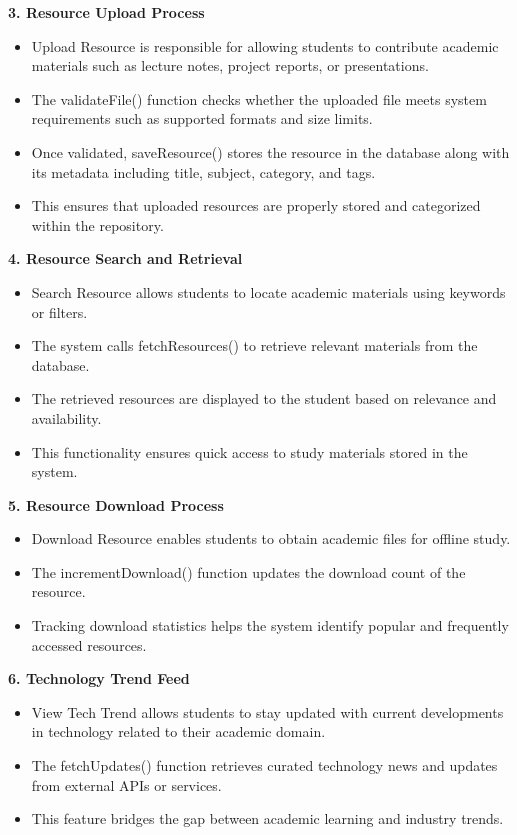 \documentclass[12pt,a4paper]{report}
\begin{document}
\textbf{3. Resource Upload Process}

\begin{itemize}
\item Upload Resource is responsible for allowing students to contribute academic materials such as lecture notes, project reports, or presentations.
\item The validateFile() function checks whether the uploaded file meets system requirements such as supported formats and size limits.
\item Once validated, saveResource() stores the resource in the database along with its metadata including title, subject, category, and tags.
\item This ensures that uploaded resources are properly stored and categorized within the repository.
\end{itemize}

\textbf{4. Resource Search and Retrieval}

\begin{itemize}
\item Search Resource allows students to locate academic materials using keywords or filters.
\item The system calls fetchResources() to retrieve relevant materials from the database.
\item The retrieved resources are displayed to the student based on relevance and availability.
\item This functionality ensures quick access to study materials stored in the system.
\end{itemize}

\textbf{5. Resource Download Process}

\begin{itemize}
\item Download Resource enables students to obtain academic files for offline study.
\item The incrementDownload() function updates the download count of the resource.
\item Tracking download statistics helps the system identify popular and frequently accessed resources.
\end{itemize}

\textbf{6. Technology Trend Feed}

\begin{itemize}
\item View Tech Trend allows students to stay updated with current developments in technology related to their academic domain.
\item The fetchUpdates() function retrieves curated technology news and updates from external APIs or services.
\item This feature bridges the gap between academic learning and industry trends.
\end{itemize}
\end{document}
